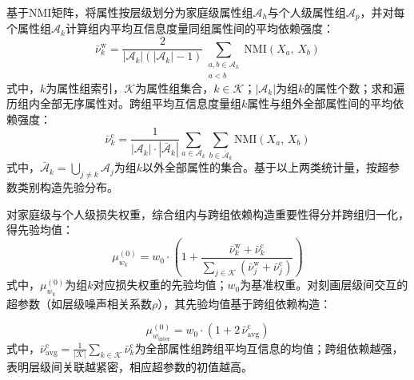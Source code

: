 基于NMI矩阵，将属性按层级划分为家庭级属性组$\mathcal{A}_{h}$与个人级属性组$\mathcal{A}_{p}$，并对每个属性组$\mathcal{A}_{k}$计算组内平均互信息度量同组属性间的平均依赖强度：
\begin{equation}
  \bar{\nu}_{k}^{\mathrm{w}} = \frac{2}{\left|\mathcal{A}_{k}\right| \left(\left|\mathcal{A}_{k}\right| - 1\right)} \sum_{\substack{a, b \in \mathcal{A}_{k} \\ a < b}} \mathrm{NMI}\left(X_a,\, X_b\right)
  \label{eq.popsyn.miwithin}
\end{equation}
式中，$k$为属性组索引，$\mathcal{K}$为属性组集合，$k \in \mathcal{K}$；$|\mathcal{A}_{k}|$为组$k$的属性个数；求和遍历组内全部无序属性对。跨组平均互信息度量组$k$属性与组外全部属性间的平均依赖强度：
\begin{equation}
  \bar{\nu}_{k}^{\mathrm{c}} = \frac{1}{\left|\mathcal{A}_{k}\right| \cdot \left|\bar{\mathcal{A}}_{k}\right|} \sum_{a \in \mathcal{A}_{k}} \sum_{b \in \bar{\mathcal{A}}_{k}} \mathrm{NMI}\left(X_a,\, X_b\right)
  \label{eq.popsyn.micross}
\end{equation}
式中，$\bar{\mathcal{A}}_{k} = \bigcup_{j \neq k} \mathcal{A}_{j}$为组$k$以外全部属性的集合。基于以上两类统计量，按超参数类别构造先验分布。
 
对家庭级与个人级损失权重，综合组内与跨组依赖构造重要性得分并跨组归一化，得先验均值：
\begin{equation}
  \mu_{w_k}^{(0)} = w_{0} \cdot \left(1 + \frac{\bar{\nu}_{k}^{\mathrm{w}} + \bar{\nu}_{k}^{\mathrm{c}}}{\sum_{j \in \mathcal{K}} \left(\bar{\nu}_{j}^{\mathrm{w}} + \bar{\nu}_{j}^{\mathrm{c}}\right)}\right)
  \label{eq.popsyn.priormu}
\end{equation}
式中，$\mu_{w_k}^{(0)}$为组$k$对应损失权重的先验均值；$w_{0}$为基准权重。对刻画层级间交互的超参数（如层级噪声相关系数$\rho$），其先验均值基于跨组依赖构造：

\begin{equation}
  \mu_{w_{\mathrm{inter}}}^{(0)} = w_{0} \cdot \left(1 + 2\, \bar{\nu}_{\mathrm{avg}}^{\mathrm{c}}\right)
  \label{eq.popsyn.priormuinter}
\end{equation}
式中，$\bar{\nu}_{\mathrm{avg}}^{\mathrm{c}} = \frac{1}{|\mathcal{K}|} \sum_{k \in \mathcal{K}} \bar{\nu}_{k}^{\mathrm{c}}$为全部属性组跨组平均互信息的均值；跨组依赖越强，表明层级间关联越紧密，相应超参数的初值越高。
 

